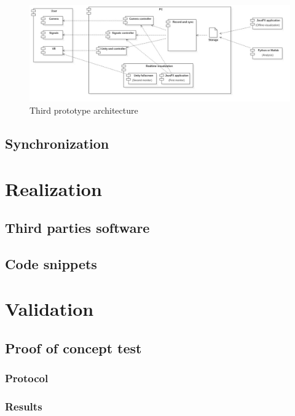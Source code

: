 \documentclass[binding=0.6cm,LaM]{sapthesis}
\begin{document}
\begin{figure}[h]
\centering
\includegraphics[scale=.5, angle=90]{images/prot3_architecture}
\caption{Third prototype architecture}
\end{figure}

\section{Synchronization}
\label{sec:sync}





\chapter{Realization}


\section{Third parties software}
\label{sec:thirdparty}

\section{Code snippets}

\chapter{Validation}
\section{Proof of concept test}

\subsection{Protocol}

\subsection{Results}
\end{document}
